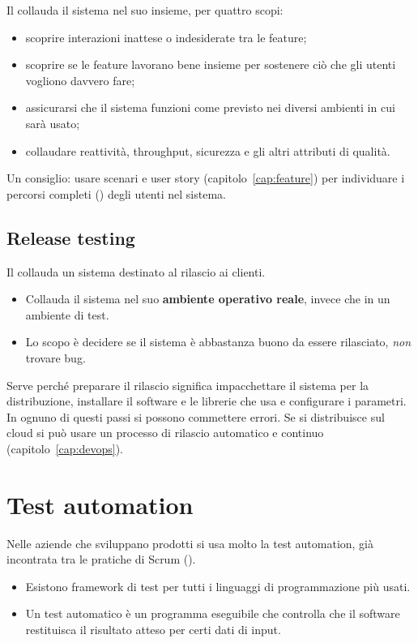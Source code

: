 Il  collauda il sistema nel suo insieme, per quattro scopi:
\begin{itemize}
  \item scoprire interazioni inattese o indesiderate tra le feature;
  \item scoprire se le feature lavorano bene insieme per sostenere ciò che gli utenti vogliono davvero fare;
  \item assicurarsi che il sistema funzioni come previsto nei diversi ambienti in cui sarà usato;
  \item collaudare reattività, throughput, sicurezza e gli altri attributi di qualità.
\end{itemize}
Un consiglio: usare scenari e user story (capitolo~\ref{cap:feature}) per individuare i percorsi completi
() degli utenti nel sistema.

\subsection{Release testing}
\label{sec:test-release}

Il  collauda un sistema destinato al rilascio ai clienti.
\begin{itemize}
  \item Collauda il sistema nel suo \textbf{ambiente operativo reale}, invece che in un ambiente di test.
  \item Lo scopo è decidere se il sistema è abbastanza buono da essere rilasciato, \emph{non} trovare bug.
\end{itemize}
Serve perché preparare il rilascio significa impacchettare il sistema per la distribuzione, installare il software e
le librerie che usa e configurare i parametri. In ognuno di questi passi si possono commettere errori. Se si
distribuisce sul cloud si può usare un processo di rilascio automatico e continuo (capitolo~\ref{cap:devops}).

\section{Test automation}
\label{sec:test-automazione}

Nelle aziende che sviluppano prodotti si usa molto la test automation, già incontrata tra le pratiche di Scrum
().
\begin{itemize}
  \item Esistono framework di test per tutti i linguaggi di programmazione più usati.
  \item Un test automatico è un programma eseguibile che controlla che il software restituisca il risultato atteso
    per certi dati di input.
\end{itemize}

